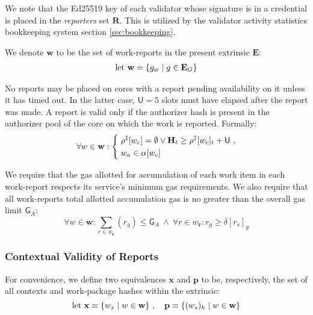 We note that the Ed25519 key of each validator whose signature is in a credential is placed in the \emph{reporters} set $\mathbf{R}$. This is utilized by the validator activity statistics bookkeeping system section \ref{sec:bookkeeping}.

We denote $\mathbf{w}$ to be the set of work-reports in the present extrinsic $\mathbf{E}$:
\begin{align}
  \text{let}\ \mathbf{w} = \{ g_w \mid g \in \mathbf{E}_G \}
\end{align}

No reports may be placed on cores with a report pending availability on it unless it has timed out. In the latter case, $\mathsf{U} = 5$ slots must have elapsed after the report was made. A report is valid only if the authorizer hash is present in the authorizer pool of the core on which the work is reported. Formally:
\begin{equation}\label{eq:reportcoresareunusedortimedout}
  \forall w \in \mathbf{w} :\left\{\;\begin{aligned}
    &\rho^\ddagger[w_c] = \none \vee \mathbf{H}_t \ge \rho^\ddagger[w_c]_t + \mathsf{U}\ , \\
    &w_a \in \alpha[w_c]
  \end{aligned}\right.
\end{equation}

We require that the gas allotted for accumulation of each work item in each work-report respects its service's minimum gas requirements. We also require that all work-reports total allotted accumulation gas is no greater than the overall gas limit $\mathsf{G}_A$:
\begin{equation}
  \forall w \in \mathbf{w}:
    \sum_{r \in w_\mathbf{r}}\!(r_g) \le \mathsf{G}_A \ \wedge \ 
    \forall r \in w_\mathbf{r}: r_g \ge \delta[r_s]_g
\end{equation}












\subsubsection{Contextual Validity of Reports}\label{sec:contextualvalidity}

For convenience, we define two equivalences $\mathbf{x}$ and $\mathbf{p}$ to be, respectively, the set of all contexts and work-package hashes within the extrinsic:
\begin{equation}
    \text{let } \mathbf{x} \equiv \{ w_x \mid w \in \mathbf{w} \}\ ,\quad
    \mathbf{p} \equiv \{ (w_s)_h \mid w \in \mathbf{w} \}
\end{equation}


